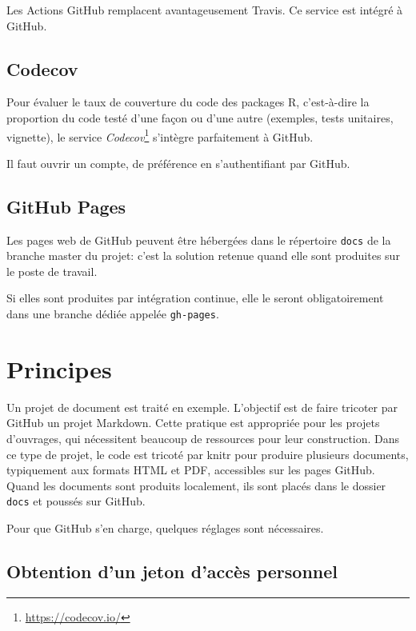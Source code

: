 \documentclass[
  12pt,
  french,
  a4paper,
  extrafontsizes,onecolumn,openright
  ]{memoir}
\newlength{\rf}
\begin{document}
Les Actions GitHub remplacent avantageusement Travis.
Ce service est intégré à GitHub.

\hypertarget{codecov}{%
\subsection{Codecov}\label{codecov}}

Pour évaluer le taux de couverture du code des packages R, c'est-à-dire la proportion du code testé d'une façon ou d'une autre (exemples, tests unitaires, vignette), le service \emph{Codecov}\footnote{\url{https://codecov.io/}} s'intègre parfaitement à GitHub.

Il faut ouvrir un compte, de préférence en s'authentifiant par GitHub.

\hypertarget{github-pages}{%
\subsection{GitHub Pages}\label{github-pages}}

Les pages web de GitHub peuvent être hébergées dans le répertoire \texttt{docs} de la branche master du projet: c'est la solution retenue quand elle sont produites sur le poste de travail.

Si elles sont produites par intégration continue, elle le seront obligatoirement dans une branche dédiée appelée \texttt{gh-pages}.

\hypertarget{principes}{%
\section{Principes}\label{principes}}

Un projet de document est traité en exemple.
L'objectif est de faire tricoter par GitHub un projet Markdown.
Cette pratique est appropriée pour les projets d'ouvrages, qui nécessitent beaucoup de ressources pour leur construction.
Dans ce type de projet, le code est tricoté par knitr pour produire plusieurs documents, typiquement aux formats HTML et PDF, accessibles sur les pages GitHub.
Quand les documents sont produits localement, ils sont placés dans le dossier \texttt{docs} et poussés sur GitHub.

Pour que GitHub s'en charge, quelques réglages sont nécessaires.

\hypertarget{sec:pat}{%
\subsection{Obtention d'un jeton d'accès personnel}\label{sec:pat}}
\end{document}
